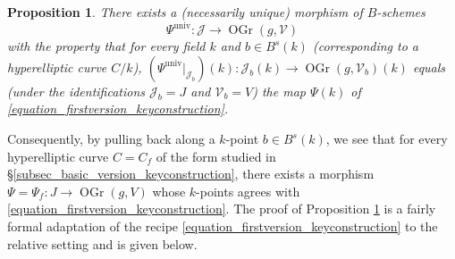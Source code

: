 \documentclass{article} %
\newtheorem{proposition}{Proposition}[section]
\numberwithin{equation}{section}
\newcommand{\sh}[1]{\mathscr{#1}}
\DeclareMathOperator{\OGr}{OGr}
\begin{document}
\begin{proposition}\label{proposition_universal_kummerembedding}
    There exists a (necessarily unique) morphism of $B$-schemes 
    \[
    \Psi^{\mathrm{univ}} \colon \mathcal{J}\rightarrow \OGr(g, \sh{V})
    \]
    with the property that for every field $k$ and $b\in B^s(k)$ (corresponding to a hyperelliptic curve $C/k$), $(\Psi^{\mathrm{univ}}|_{\mathcal{J}_b})(k)\colon \mathcal{J}_b(k) \rightarrow \OGr(g,\sh{V}_b)(k)$ equals (under the identifications $\mathcal{J}_b = J$ and $\sh{V}_b = V$) the map $\Psi(k)$ of \eqref{equation_firstversion_keyconstruction}.
\end{proposition}

Consequently, by pulling back along a $k$-point $b\in B^s(k)$, we see that for every hyperelliptic curve $C = C_f$ of the form studied in \S\ref{subsec_basic_version_keyconstruction}, there exists a morphism $\Psi = \Psi_f\colon J \rightarrow \OGr(g,V)$ whose $k$-points agrees with \eqref{equation_firstversion_keyconstruction}.
The proof of Proposition \ref{proposition_universal_kummerembedding} is a fairly formal adaptation of the recipe \eqref{equation_firstversion_keyconstruction} to the relative setting and is given below.
\end{document}
